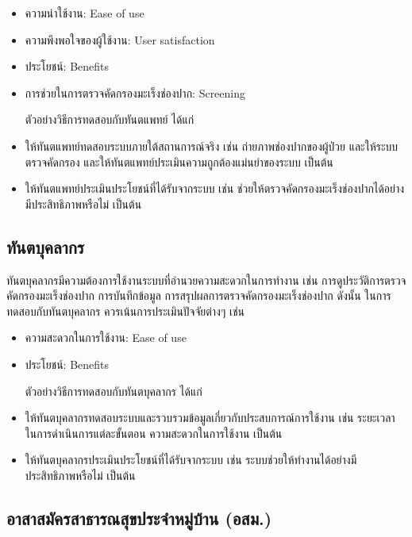 \begin{itemize}
    \item ความน่าใช้งาน: Ease of use
    \item ความพึงพอใจของผู้ใช้งาน: User satisfaction
    \item ประโยชน์: Benefits
    \item การช่วยในการตรวจคัดกรองมะเร็งช่องปาก: Screening


          ตัวอย่างวิธีการทดสอบกับทันตแพทย์ ได้แก่

    \item ให้ทันตแพทย์ทดสอบระบบภายใต้สถานการณ์จริง เช่น ถ่ายภาพช่องปากของผู้ป่วย และให้ระบบตรวจคัดกรอง และให้ทันตแพทย์ประเมินความถูกต้องแม่นยำของระบบ เป็นต้น
    \item ให้ทันตแพทย์ประเมินประโยชน์ที่ได้รับจากระบบ เช่น ช่วยให้ตรวจคัดกรองมะเร็งช่องปากได้อย่างมีประสิทธิภาพหรือไม่ เป็นต้น

\end{itemize}


\subsection{ทันตบุคลากร}

ทันตบุคลากรมีความต้องการใช้งานระบบที่อำนวยความสะดวกในการทำงาน เช่น การดูประวัติการตรวจคัดกรองมะเร็งช่องปาก การบันทึกข้อมูล การสรุปผลการตรวจคัดกรองมะเร็งช่องปาก ดังนั้น ในการทดสอบกับทันตบุคลากร ควรเน้นการประเมินปัจจัยต่างๆ เช่น

\begin{itemize}
\item ความสะดวกในการใช้งาน: Ease of use
\item ประโยชน์: Benefits


ตัวอย่างวิธีการทดสอบกับทันตบุคลากร ได้แก่

\item ให้ทันตบุคลากรทดสอบระบบและรวบรวมข้อมูลเกี่ยวกับประสบการณ์การใช้งาน เช่น ระยะเวลาในการดำเนินการแต่ละขั้นตอน ความสะดวกในการใช้งาน เป็นต้น
\item ให้ทันตบุคลากรประเมินประโยชน์ที่ได้รับจากระบบ เช่น ระบบช่วยให้ทำงานได้อย่างมีประสิทธิภาพหรือไม่ เป็นต้น
\end{itemize}

\subsection{อาสาสมัครสาธารณสุขประจําหมู่บ้าน (อสม.)}

